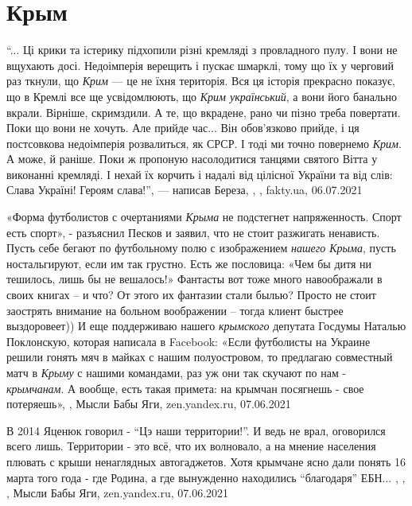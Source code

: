  
 
 
 
 
\chapter{Крым}

\enquote{... Ці крики та істерику підхопили різні кремляді з провладного пулу. І вони не
вщухають досі. Недоімперія верещить і пускає шмарклі, тому що їх у черговий раз
ткнули, що \emph{Крим} — це не їхня територія. Вся ця історія прекрасно показує, що в
Кремлі все ще усвідомлюють, що \emph{Крим український}, а вони його банально вкрали.
Вірніше, скримздили. А те, що вкрадене, рано чи пізно треба повертати. Поки що
вони не хочуть. Але прийде час... Він обов'язково прийде, і ця постсовкова
недоімперія розвалиться, як СРСР. І тоді ми точно повернемо \emph{Крим}. А може, й
раніше. Поки ж пропоную насолодитися танцями святого Вітта у виконанні
кремляді. І нехай їх корчить і надалі від цілісної України та від слів: Слава
Україні! Героям слава!}, — написав Береза,
, , fakty.ua, 06.07.2021

«Форма футболистов с очертаниями \emph{Крыма} не подстегнет напряженность.
Спорт есть спорт», - разъяснил Песков и заявил, что не стоит разжигать
ненависть.  Пусть себе бегают по футбольному полю с изображением \emph{нашего
Крыма}, пусть ностальгируют, если им так грустно. Есть же пословица: «Чем бы
дитя ни тешилось, лишь бы не вешалось!» Фантасты вот тоже много навоображали в
своих книгах – и что? От этого их фантазии стали былью? Просто не стоит
заострять внимание на больном воображении – тогда клиент быстрее выздоровеет))
И еще поддерживаю нашего \emph{крымского} депутата Госдумы Наталью Поклонскую,
которая написала в Facebook: «Если футболисты на Украине решили гонять мяч в
майках с нашим полуостровом, то предлагаю совместный матч в \emph{Крыму} с
нашими командами, раз уж они так скучают по нам - \emph{крымчанам}. А вообще,
есть такая примета: на крымчан посягнешь - свое потеряешь»,
, Мысли Бабы Яги, zen.yandex.ru, 07.06.2021

В 2014 Яценюк говорил - \enquote{Цэ наши территории!}. И ведь не врал,
оговорился всего лишь. Территории - это всё, что их волновало, а на мнение
населения плювать с крыши ненаглядных автогаджетов. Хотя крымчане ясно дали
понять 16 марта того года - где Родина, а где вынужденно находились
\enquote{благодаря} ЕБН... ,
,
, Мысли Бабы Яги, zen.yandex.ru, 07.06.2021

